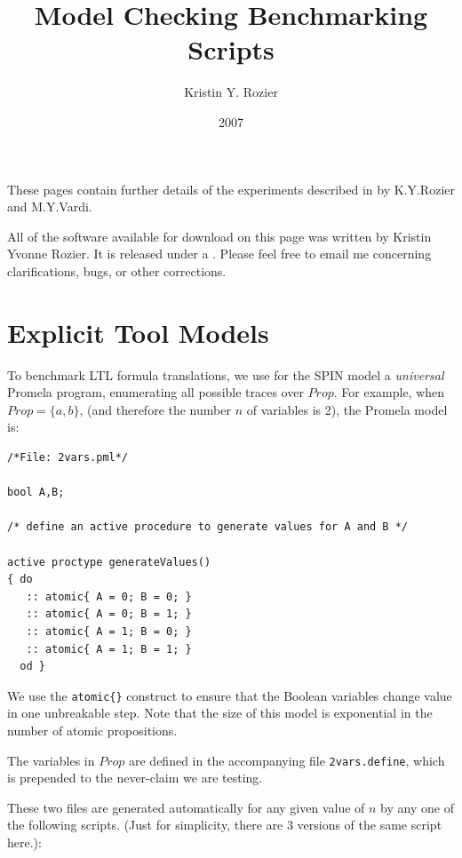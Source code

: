 \documentclass{article}
\title{Model Checking Benchmarking Scripts}
\author{Kristin Y. Rozier}
\date{2007}
\begin{document}
\maketitle

These pages contain further details of the experiments described in  by K.Y.Rozier and M.Y.Vardi.

All of the software available for download on this page was written by Kristin Yvonne Rozier. It is released under a . Please feel free to email me concerning clarifications, bugs, or other corrections.

\section{Explicit Tool Models}
To benchmark LTL formula translations, we use for the SPIN model a \emph{universal} Promela program, enumerating all possible traces over $Prop$. For example, when $Prop = \{a, b\}$, (and therefore the number $n$ of variables is 2), the Promela model is:

\begin{verbatim}
/*File: 2vars.pml*/

bool A,B;

/* define an active procedure to generate values for A and B */

active proctype generateValues()
{ do
   :: atomic{ A = 0; B = 0; }
   :: atomic{ A = 0; B = 1; }
   :: atomic{ A = 1; B = 0; }
   :: atomic{ A = 1; B = 1; }
  od }
\end{verbatim}

We use the \texttt{atomic\{\}} construct to ensure that the Boolean variables change value in one unbreakable step. Note that the size of this model is exponential in the number of atomic propositions.

The variables in $Prop$ are defined in the accompanying file \texttt{2vars.define}, which is prepended to the never-claim we are testing.

These two files are generated automatically for any given value of $n$ by any one of the following scripts. (Just for simplicity, there are 3 versions of the same script here.):
\end{document}
